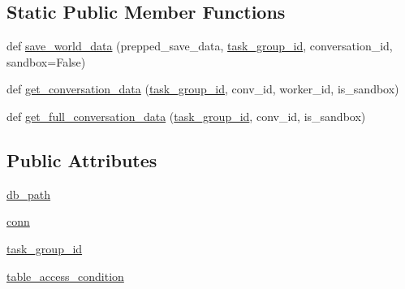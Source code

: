 \subsection*{Static Public Member Functions}
\begin{DoxyCompactItemize}
\item 
def \hyperlink{classparlai_1_1mturk_1_1core_1_1legacy__2018_1_1mturk__data__handler_1_1MTurkDataHandler_a823e69b5a768d557ec581c376751681d}{save\+\_\+world\+\_\+data} (prepped\+\_\+save\+\_\+data, \hyperlink{classparlai_1_1mturk_1_1core_1_1legacy__2018_1_1mturk__data__handler_1_1MTurkDataHandler_ab743471dc641c785f93d9c1285967162}{task\+\_\+group\+\_\+id}, conversation\+\_\+id, sandbox=False)
\item 
def \hyperlink{classparlai_1_1mturk_1_1core_1_1legacy__2018_1_1mturk__data__handler_1_1MTurkDataHandler_a0726a2a5d8840cde079523917ee0706d}{get\+\_\+conversation\+\_\+data} (\hyperlink{classparlai_1_1mturk_1_1core_1_1legacy__2018_1_1mturk__data__handler_1_1MTurkDataHandler_ab743471dc641c785f93d9c1285967162}{task\+\_\+group\+\_\+id}, conv\+\_\+id, worker\+\_\+id, is\+\_\+sandbox)
\item 
def \hyperlink{classparlai_1_1mturk_1_1core_1_1legacy__2018_1_1mturk__data__handler_1_1MTurkDataHandler_a525c02fdb0cfb16a780b0aa8ac787a57}{get\+\_\+full\+\_\+conversation\+\_\+data} (\hyperlink{classparlai_1_1mturk_1_1core_1_1legacy__2018_1_1mturk__data__handler_1_1MTurkDataHandler_ab743471dc641c785f93d9c1285967162}{task\+\_\+group\+\_\+id}, conv\+\_\+id, is\+\_\+sandbox)
\end{DoxyCompactItemize}
\subsection*{Public Attributes}
\begin{DoxyCompactItemize}
\item 
\hyperlink{classparlai_1_1mturk_1_1core_1_1legacy__2018_1_1mturk__data__handler_1_1MTurkDataHandler_a9a4a94445bb4dc2b12d87773c5a70fae}{db\+\_\+path}
\item 
\hyperlink{classparlai_1_1mturk_1_1core_1_1legacy__2018_1_1mturk__data__handler_1_1MTurkDataHandler_a88135bd7373c3a4c1c1c76f281787c64}{conn}
\item 
\hyperlink{classparlai_1_1mturk_1_1core_1_1legacy__2018_1_1mturk__data__handler_1_1MTurkDataHandler_ab743471dc641c785f93d9c1285967162}{task\+\_\+group\+\_\+id}
\item 
\hyperlink{classparlai_1_1mturk_1_1core_1_1legacy__2018_1_1mturk__data__handler_1_1MTurkDataHandler_ad220dc0e4a4e6d47ce147b919d4d7487}{table\+\_\+access\+\_\+condition}
\end{DoxyCompactItemize}


